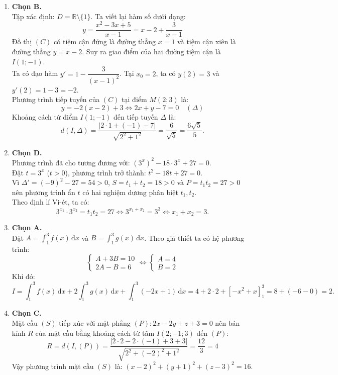 \documentclass[12pt,a4paper]{article}
\begin{document}
\begin{enumerate}[label=\textbf{Câu \arabic*:}, leftmargin=*]

\item \textbf{Chọn B.}\\
Tập xác định: $D = \mathbb{R} \setminus \{1\}$. Ta viết lại hàm số dưới dạng:
$$y = \dfrac{x^2 - 3x + 5}{x - 1} = x - 2 + \dfrac{3}{x - 1}$$
Đồ thị $(C)$ có tiệm cận đứng là đường thẳng $x = 1$ và tiệm cận xiên là đường thẳng $y = x - 2$. Suy ra giao điểm của hai đường tiệm cận là $I(1; -1)$.\\
Ta có đạo hàm $y' = 1 - \dfrac{3}{(x - 1)^2}$. Tại $x_0 = 2$, ta có $y(2) = 3$ và $y'(2) = 1 - 3 = -2$.\\
Phương trình tiếp tuyến của $(C)$ tại điểm $M(2; 3)$ là:
$$y = -2(x - 2) + 3 \iff 2x + y - 7 = 0 \quad (\Delta)$$
Khoảng cách từ điểm $I(1; -1)$ đến tiếp tuyến $\Delta$ là:
$$d(I, \Delta) = \dfrac{|2\cdot 1 + (-1) - 7|}{\sqrt{2^2 + 1^2}} = \dfrac{6}{\sqrt{5}} = \dfrac{6\sqrt{5}}{5}.$$

\item \textbf{Chọn D.}\\
Phương trình đã cho tương đương với: $(3^x)^2 - 18\cdot 3^x + 27 = 0$.\\
Đặt $t = 3^x$ ($t > 0$), phương trình trở thành: $t^2 - 18t + 27 = 0$.\\
Vì $\Delta' = (-9)^2 - 27 = 54 > 0$, $S = t_1 + t_2 = 18 > 0$ và $P = t_1 t_2 = 27 > 0$ nên phương trình ẩn $t$ có hai nghiệm dương phân biệt $t_1, t_2$.\\
Theo định lí Vi-ét, ta có:
$$3^{x_1} \cdot 3^{x_2} = t_1 t_2 = 27 \iff 3^{x_1 + x_2} = 3^3 \iff x_1 + x_2 = 3.$$

\item \textbf{Chọn A.}\\
Đặt $A = \displaystyle\int_{1}^{3} f(x)\,\mathrm{d}x$ và $B = \displaystyle\int_{1}^{3} g(x)\,\mathrm{d}x$. Theo giả thiết ta có hệ phương trình:
$$\begin{cases} A + 3B = 10 \\ 2A - B = 6 \end{cases} \iff \begin{cases} A = 4 \\ B = 2 \end{cases}$$
Khi đó:
$$I = \int_{1}^{3} f(x)\,\mathrm{d}x + 2\int_{1}^{3} g(x)\,\mathrm{d}x + \int_{1}^{3} (-2x + 1)\,\mathrm{d}x = 4 + 2\cdot 2 + \left[-x^2 + x\right]_{1}^{3} = 8 + (-6 - 0) = 2.$$

\item \textbf{Chọn C.}\\
Mặt cầu $(S)$ tiếp xúc với mặt phẳng $(P): 2x - 2y + z + 3 = 0$ nên bán kính $R$ của mặt cầu bằng khoảng cách từ tâm $I(2; -1; 3)$ đến $(P)$:
$$R = d(I, (P)) = \dfrac{|2\cdot 2 - 2\cdot(-1) + 3 + 3|}{\sqrt{2^2 + (-2)^2 + 1^2}} = \dfrac{12}{3} = 4$$
Vậy phương trình mặt cầu $(S)$ là: $(x - 2)^2 + (y + 1)^2 + (z - 3)^2 = 16$.


\end{enumerate}
\end{document}

